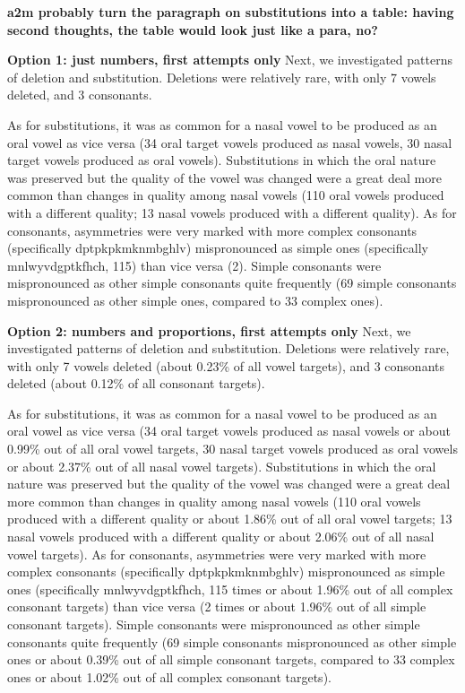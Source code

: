 \documentclass[english,,man,floatsintext]{apa6}
\begin{document}
\textbf{a2m probably turn the paragraph on substitutions into a table: having second thoughts, the table would look just like a para, no?}

\textbf{Option 1: just numbers, first attempts only }
Next, we investigated patterns of deletion and substitution. Deletions were relatively rare, with only 7 vowels deleted, and 3 consonants.

As for substitutions, it was as common for a nasal vowel to be produced as an oral vowel as vice versa (34 oral target vowels produced as nasal vowels, 30 nasal target vowels produced as oral vowels). Substitutions in which the oral nature was preserved but the quality of the vowel was changed were a great deal more common than changes in quality among nasal vowels (110 oral vowels produced with a different quality; 13 nasal vowels produced with a different quality). As for consonants, asymmetries were very marked with more complex consonants (specifically dptpkpkmknmbghlv) mispronounced as simple ones (specifically mnlwyvdgptkfhch, 115) than vice versa (2). Simple consonants were mispronounced as other simple consonants quite frequently (69 simple consonants mispronounced as other simple ones, compared to 33 complex ones).

\textbf{Option 2: numbers and proportions, first attempts only}
Next, we investigated patterns of deletion and substitution. Deletions were relatively rare, with only 7 vowels deleted (about 0.23\% of all vowel targets), and 3 consonants deleted (about 0.12\% of all consonant targets).

As for substitutions, it was as common for a nasal vowel to be produced as an oral vowel as vice versa (34 oral target vowels produced as nasal vowels or about 0.99\% out of all oral vowel targets, 30 nasal target vowels produced as oral vowels or about 2.37\% out of all nasal vowel targets). Substitutions in which the oral nature was preserved but the quality of the vowel was changed were a great deal more common than changes in quality among nasal vowels (110 oral vowels produced with a different quality or about 1.86\% out of all oral vowel targets; 13 nasal vowels produced with a different quality or about 2.06\% out of all nasal vowel targets). As for consonants, asymmetries were very marked with more complex consonants (specifically dptpkpkmknmbghlv) mispronounced as simple ones (specifically mnlwyvdgptkfhch, 115 times or about 1.96\% out of all complex consonant targets) than vice versa (2 times or about 1.96\% out of all simple consonant targets). Simple consonants were mispronounced as other simple consonants quite frequently (69 simple consonants mispronounced as other simple ones or about 0.39\% out of all simple consonant targets, compared to 33 complex ones or about 1.02\% out of all complex consonant targets).
\end{document}
